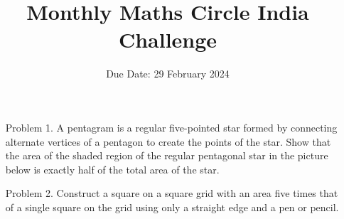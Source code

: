 \documentclass[a4paper,12pt]{article}
\title{Monthly Maths Circle India Challenge}
\date{Due Date: 29 February 2024}
\begin{document}
\maketitle
\begin{enumerate}
    \item[Problem 1.] A pentagram is a regular five-pointed star formed by connecting alternate vertices of a pentagon to create the points of the star. Show that the area of the shaded region of the regular pentagonal star in the picture below is exactly half of the total area of the star.
    \begin{figure}[h]
        \centering
        
    \end{figure}
    \item[Problem 2.] Construct a square on a square grid with an area five times that of a single square on the grid using only a straight edge and a pen or pencil.
    \begin{figure}[h]
        \centering
    \end{figure}
\end{enumerate}
\end{document}
